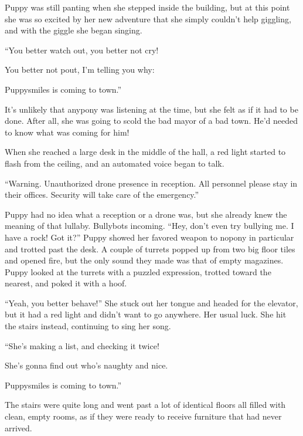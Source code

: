 Puppy was still panting when she stepped inside the building, but at this point she was so excited by her new adventure that she simply couldn't help giggling, and with the giggle she began singing.



\begin{song}
		``You better watch out, you better not cry!
	
		You better not pout, I'm telling you why:
	
		Puppysmiles is coming to town.''
\end{song}

It's unlikely that anypony was listening at the time, but she felt as if it had to be done. After all, she was going to scold the bad mayor of a bad town. He'd needed to know what was coming for him!

When she reached a large desk in the middle of the hall, a red light started to flash from the ceiling, and an automated voice began to talk.

{\mt ``Warning. Unauthorized drone presence in reception. All personnel please stay in their offices. Security will take care of the emergency.''}

Puppy had no idea what a reception or a drone was, but she already knew the meaning of that lullaby. Bullybots incoming. ``Hey, don't even try bullying me. I have a rock! Got it?'' Puppy showed her favored weapon to nopony in particular and trotted past the desk. A couple of turrets popped up from two big floor tiles and opened fire, but the only sound they made was that of empty magazines. Puppy looked at the turrets with a puzzled expression, trotted toward the nearest, and poked it with a hoof.

``Yeah, you better behave!'' She stuck out her tongue and headed for the elevator, but it had a red light and didn't want to go anywhere. Her usual luck. She hit the stairs instead, continuing to sing her song.

\begin{song}
	``She's making a list, and checking it twice!

	She's gonna find out who's naughty and nice.

	Puppysmiles is coming to town.''
\end{song}

The stairs were quite long and went past a lot of identical floors all filled with clean, empty rooms, as if they were ready to receive furniture that had never arrived.

